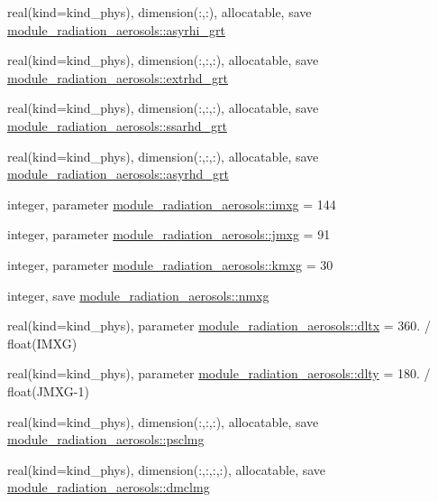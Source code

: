 \begin{DoxyCompactItemize}
\item 
real(kind=kind\+\_\+phys), dimension(\+:,\+:), allocatable, save \hyperlink{group__module__radiation__aerosols_ga4b5f80817af9f2116618d6c8f0e194de}{module\+\_\+radiation\+\_\+aerosols\+::asyrhi\+\_\+grt}
\item 
real(kind=kind\+\_\+phys), dimension(\+:,\+:,\+:), allocatable, save \hyperlink{group__module__radiation__aerosols_ga07bfe1ada075519d1d3ceabe21b65a96}{module\+\_\+radiation\+\_\+aerosols\+::extrhd\+\_\+grt}
\item 
real(kind=kind\+\_\+phys), dimension(\+:,\+:,\+:), allocatable, save \hyperlink{group__module__radiation__aerosols_ga4aa91ab1d0b9d71c704dc565ef4704bf}{module\+\_\+radiation\+\_\+aerosols\+::ssarhd\+\_\+grt}
\item 
real(kind=kind\+\_\+phys), dimension(\+:,\+:,\+:), allocatable, save \hyperlink{group__module__radiation__aerosols_ga2da45b8bd425415ca417f6590cc54da6}{module\+\_\+radiation\+\_\+aerosols\+::asyrhd\+\_\+grt}
\item 
integer, parameter \hyperlink{group__module__radiation__aerosols_gaa7b2e0e1d0669af4efc75cb32301f1f1}{module\+\_\+radiation\+\_\+aerosols\+::imxg} = 144
\item 
integer, parameter \hyperlink{group__module__radiation__aerosols_ga816ee06781e63adf8752a9a67ab2da2d}{module\+\_\+radiation\+\_\+aerosols\+::jmxg} = 91
\item 
integer, parameter \hyperlink{group__module__radiation__aerosols_ga5339e589d92fab8cbb310b84b6ca3d9e}{module\+\_\+radiation\+\_\+aerosols\+::kmxg} = 30
\item 
integer, save \hyperlink{group__module__radiation__aerosols_gadb4c4cdc8e3212777229d1f54e79bb05}{module\+\_\+radiation\+\_\+aerosols\+::nmxg}
\item 
real(kind=kind\+\_\+phys), parameter \hyperlink{group__module__radiation__aerosols_ga084315fde4afcad23cd3aeb18a4d8a4e}{module\+\_\+radiation\+\_\+aerosols\+::dltx} = 360. / float(I\+M\+XG)
\item 
real(kind=kind\+\_\+phys), parameter \hyperlink{group__module__radiation__aerosols_ga499bb3c75e9802c5ee7fd6cdb6660f7e}{module\+\_\+radiation\+\_\+aerosols\+::dlty} = 180. / float(J\+M\+XG-\/1)
\item 
real(kind=kind\+\_\+phys), dimension(\+:,\+:,\+:), allocatable, save \hyperlink{group__module__radiation__aerosols_ga942aa3a9f61cb40592bd0879a91c2ede}{module\+\_\+radiation\+\_\+aerosols\+::psclmg}
\item 
real(kind=kind\+\_\+phys), dimension(\+:,\+:,\+:,\+:), allocatable, save \hyperlink{group__module__radiation__aerosols_ga123d552c7f98f7371565f4e2017efd45}{module\+\_\+radiation\+\_\+aerosols\+::dmclmg}

\end{DoxyCompactItemize}
